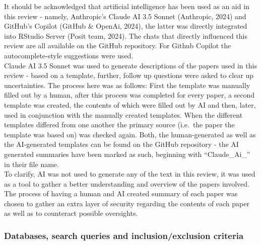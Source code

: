 \documentclass[
  stu]{apa7}
\begin{document}
It should be acknowledged that artificial intelligence has been used as an aid in this review - namely, Anthropic's Claude AI 3.5 Sonnet (Anthropic, 2024) and GitHub's Copilot (GitHub \& OpenAi, 2024), the latter was directly integrated into RStudio Server (Posit team, 2024). The chats that directly influenced this review are all available on the GitHub repository.
For Github Copilot the autocomplete-style suggestions were used.\\
Claude AI 3.5 Sonnet was used to generate descriptions of the papers used in this review - based on a template, further, follow up questions were asked to clear up uncertainties.
The process here was as follows: First the template was manually filled out by a human, after this process was completed for every paper, a second template was created, the contents of which were filled out by AI and then, later, used in conjunction with the manually created templates. When the different templates differed from one another the primary source (i.e.~the paper the template was based on) was checked again. Both, the human-generated as well as the AI-generated templates can be found on the GitHub repository - the AI generated summaries have been marked as such, beginning with ``Claude\_Ai\_'' in their file name.\\
To clarify, AI was not used to generate any of the text in this review, it was used as a tool to gather a better understanding and overview of the papers involved. The process of having a human and AI created summary of each paper was chosen to gather an extra layer of security regarding the contents of each paper as well as to counteract possible oversights.

\subsubsection{Databases, search queries and inclusion/exclusion criteria}\label{databases-search-queries-and-inclusionexclusion-criteria}
\end{document}
